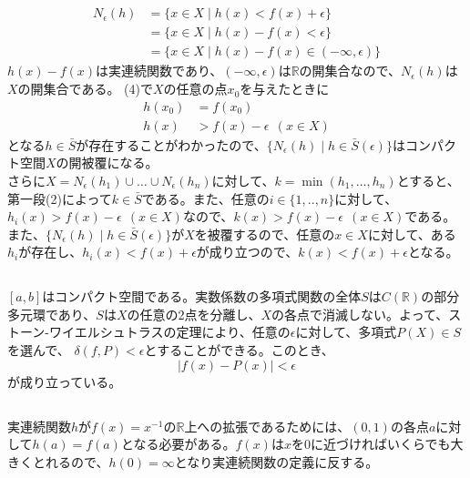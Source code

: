 \documentclass{jsarticle}
\begin{document}
\subsection{}
\begin{align*}
N_\epsilon(h)&=\{x\in X \mid h(x)<f(x)+\epsilon\}\\
&=\{x\in X\mid h(x)-f(x)<\epsilon\}\\
&=\{x\in X\mid h(x)-f(x)\in(-\infty,\epsilon)\}
\end{align*}
$h(x)-f(x)$は実連続関数であり、$(-\infty,\epsilon)$は$\mathbb{R}$の開集合なので、$N_\epsilon(h)$は$X$の開集合である。
(4)で$X$の任意の点$x_0$を与えたときに
\begin{align*}
h(x_0)&=f(x_0)\\
h(x)&>f(x)-\epsilon\ \ (x\in X)
\end{align*}
となる$h\in\bar{S}$が存在することがわかったので、$\{N_\epsilon(h)\mid h\in \bar{S}(\epsilon)\}$はコンパクト空間$X$の開被覆になる。\\

さらに$X=N_\epsilon(h_1)\cup\dots\cup N_\epsilon(h_n)$に対して、$k=\min(h_1,\dots,h_n)$とすると、第一段(2)によって$k\in\bar{S}$である。また、任意の$i\in\{1,..,n\}$に対して、$h_i(x)>f(x)-\epsilon\ \ (x\in X)$なので、$k(x)>f(x)-\epsilon\ \ (x\in X)$である。また、$\{N_\epsilon(h)\mid h\in \bar{S}(\epsilon)\}$が$X$を被覆するので、任意の$x\in X$に対して、ある$h_i$が存在し、$h_i(x)<f(x)+\epsilon$が成り立つので、$k(x)<f(x)+\epsilon$となる。



\subsection{}
$[a,b]$はコンパクト空間である。実数係数の多項式関数の全体$S$は$C(\mathbb{R})$の部分多元環であり、$S$は$X$の任意の2点を分離し、$X$の各点で消滅しない。よって、ストーン-ワイエルシュトラスの定理により、任意の$\epsilon$に対して、多項式$P(X)\in S$を選んで、
$\delta(f,P)<\epsilon$とすることができる。このとき、
\[|f(x)-P(x)|<\epsilon\]
が成り立っている。


\subsection{}
実連続関数$h$が$f(x)=x^{-1}$の$\mathbb{R}$上への拡張であるためには、$(0,1)$の各点$a$に対して$h(a)=f(a)$となる必要がある。$f(x)$は$x$を$0$に近づければいくらでも大きくとれるので、$h(0)=\infty$となり実連続関数の定義に反する。
\end{document}
